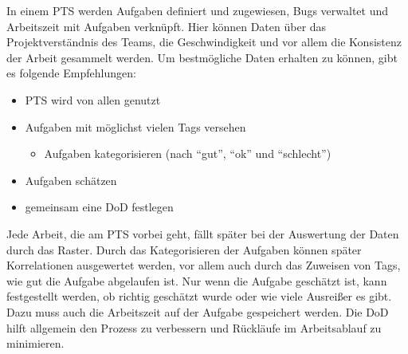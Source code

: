 In einem \ac{PTS} werden Aufgaben definiert und zugewiesen, Bugs verwaltet und Arbeitszeit mit Aufgaben verknüpft.
Hier können Daten über das Projektverständnis des Teams, die Geschwindigkeit und vor allem die Konsistenz der Arbeit gesammelt werden.
Um bestmögliche Daten erhalten zu können, gibt es folgende Empfehlungen:
\begin{itemize}[noitemsep]
  \item \ac{PTS} wird von allen genutzt
  \item Aufgaben mit möglichst vielen Tags versehen
  \begin{itemize}
    \item Aufgaben kategorisieren (nach ``gut'', ``ok'' und ``schlecht'')
  \end{itemize}
  \item Aufgaben schätzen
  \item gemeinsam eine \ac{DoD} festlegen
\end{itemize}
Jede Arbeit, die am \ac{PTS} vorbei geht, fällt später bei der Auswertung der Daten durch das Raster.
Durch das Kategorisieren der Aufgaben können später Korrelationen ausgewertet werden, vor allem auch durch das Zuweisen von Tags, wie gut die Aufgabe abgelaufen ist.
Nur wenn die Aufgabe geschätzt ist, kann festgestellt werden, ob richtig geschätzt wurde oder wie viele Ausreißer es gibt. Dazu muss auch die Arbeitszeit auf der Aufgabe gespeichert werden.
Die \ac{DoD} hilft allgemein den Prozess zu verbessern und Rückläufe im Arbeitsablauf zu minimieren.

